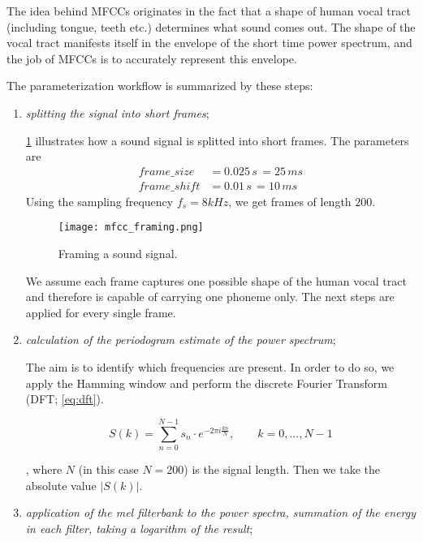 The idea behind MFCCs originates in the fact that a shape of human vocal tract (including tongue, teeth etc.) determines what sound comes out. The shape of the vocal tract manifests itself in the envelope of the short time power spectrum, and the job of MFCCs is to accurately represent this envelope.

The parameterization workflow is summarized by these steps:

\begin{enumerate}
\item \textit{splitting the signal into short frames};

\cref{fig:methods:mfcc_framing} illustrates how a sound signal is splitted into short frames. The parameters are
\begin{align*}
frame\_size &= 0.025 \,s \,= 25 \,ms \\
frame\_shift &= 0.01 \,s \,= 10 \,ms
\end{align*}
Using the sampling frequency $ f_s = 8 kHz $, we get frames of length $ 200 $.

\begin{figure}[H]
\centering
\texttt{[image: mfcc\_framing.png]}
\caption{Framing a sound signal.}
\label{fig:methods:mfcc_framing}
\end{figure}

We assume each frame captures one possible shape of the human vocal tract and therefore is capable of carrying one phoneme only. The next steps are applied for every single frame.

\item \textit{calculation of the periodogram estimate of the power spectrum}; 

The aim is to identify which frequencies are present. In order to do so, we apply the Hamming window and perform the discrete Fourier Transform (DFT; \cref{eq:dft}).

\begin{equation} \label{eq:dft}
S(k) = \displaystyle\sum_{n=0}^{N-1} s_n \cdot e^{-2 \pi i \frac{kn}{N}}, \qquad k = 0, ..., N-1
\end{equation}

, where $ N $ (in this case $ N = 200 $) is the signal length. Then we take the absolute value $ |S(k)| $.

\item \textit{application of the mel filterbank to the power spectra, summation of the energy in each filter, taking a logarithm of the result};


\end{enumerate}
